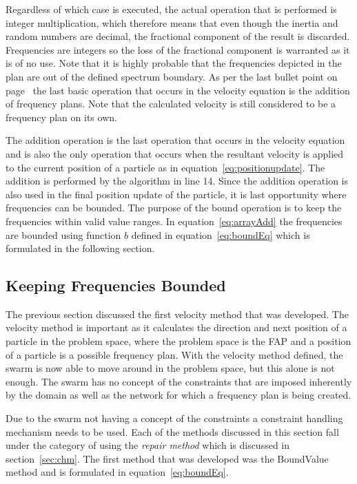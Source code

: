 Regardless of which case is executed, the actual operation that is performed is integer multiplication, which therefore means that even though the inertia and random numbers are decimal, the fractional component of the result is discarded. Frequencies are integers so the loss of the fractional component is warranted as it is of no use. Note that it is highly probable that the frequencies depicted in the plan are out of the defined spectrum boundary. As per the last bullet point on page~\pageref{lst:velocitybreakup} the last basic operation that occurs in the velocity equation is the addition of frequency plans. Note that the calculated velocity is still considered to be a frequency plan on its own.

The addition operation is the last operation that occurs in the velocity equation and is also the only operation that occurs when the resultant velocity is applied to the current position of a particle as in equation~\ref{eq:positionupdate}. The addition is performed by the algorithm in line 14. Since the addition operation is also used in the final position update of the particle, it is last opportunity where frequencies can be bounded.  The purpose of the bound operation is to keep the frequencies within valid value ranges. In equation~\ref{eq:arrayAdd} the frequencies are bounded using function $b$ defined in equation~\ref{eq:boundEq} which is formulated in the following section.
\subsection{Keeping Frequencies Bounded}
The previous section discussed the first velocity method that was developed. The velocity method is important as it calculates the direction and next position of a particle in the problem space, where the problem space is the \gls{FAP} and a position of a particle is a possible frequency plan. With the velocity method defined, the swarm is now able to move around in the problem space, but this alone is not enough. The swarm has no concept of the constraints that are imposed inherently by the domain as well as the network for which a frequency plan is being created.

Due to the swarm not having a concept of the constraints a constraint handling mechanism needs to be used. Each of the methods discussed in this section fall under the category of using the \emph{repair method} which is discussed in section~\ref{sec:chm}. The first method that was developed was the BoundValue method and is formulated in equation~\ref{eq:boundEq}.

